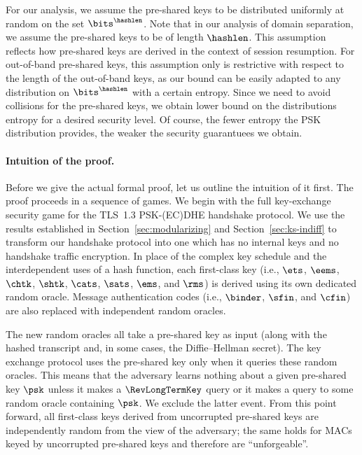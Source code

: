 \begin{remark}
	For our analysis, we assume the pre-shared keys to be distributed uniformly at random on the set $\bits^\hashlen$.
	Note that in our analysis of domain separation, we assume the pre-shared keys to be of length $\hashlen$.
	This assumption reflects how pre-shared keys are derived in the context of session resumption.
	For out-of-band pre-shared keys, this assumption only is restrictive with respect to the length of the out-of-band keys, as our bound can be easily adapted to any distribution on $\bits^\hashlen$ with a certain entropy.
	Since we need to avoid collisions for the pre-shared keys, we obtain lower bound on the distributions entropy for a desired security level.
	Of course, the fewer entropy the PSK distribution provides, the weaker the security guarantuees we obtain.
\end{remark}


\paragraph{Intuition of the proof.}
Before we give the actual formal proof, let us outline the intuition of it first.
The proof proceeds in a sequence of games.
We begin with the full key-exchange security game for the TLS~1.3 PSK-(EC)DHE handshake protocol.
We use the results established in Section~\ref{sec:modularizing} and Section~\ref{sec:ks-indiff} to transform our handshake protocol into one which has no internal keys and no handshake traffic encryption.
In place of the complex key schedule and the interdependent uses of a hash function, each first-class key (i.e., $\ets$, $\eems$, $\chtk$, $\shtk$, $\cats$, $\sats$, $\ems$, and $\rms$) is derived using its own dedicated random oracle.
Message authentication codes (i.e., $\binder$, $\sfin$, and $\cfin$) are also replaced with independent random oracles. 

The new random oracles all take a pre-shared key as input (along with the hashed transcript and, in some cases, the Diffie--Hellman secret). 
The key exchange protocol uses the pre-shared key only when it queries these random oracles.
This means that the adversary learns nothing about a given pre-shared key $\psk$ unless it makes a $\RevLongTermKey$ query or it makes a query to some random oracle containing $\psk$.
We exclude the latter event.
From this point forward, all first-class keys derived from uncorrupted pre-shared keys are independently random from the view of the adversary; the same holds for MACs keyed by uncorrupted pre-shared keys and therefore are ``unforgeable''. 

